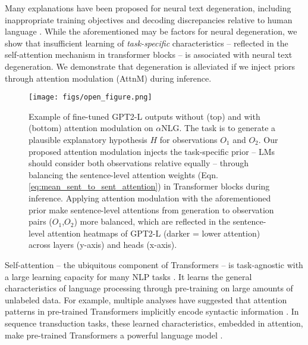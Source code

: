 \documentclass[11pt,a4paper]{article}
\newcommand{\alg}{attention modulation}
\begin{document}
Many explanations have been proposed for neural text degeneration, including inappropriate training objectives \citep{welleck2020neural} and decoding discrepancies relative to human language \cite{holtzman-etal-2018-learning, holtzman2020curious}.  While the aforementioned may be factors for neural degeneration, we show that insufficient learning of \textit{task-specific} characteristics -- reflected in the self-attention mechanism in transformer blocks -- is associated with neural text degeneration. We demonstrate that degeneration is alleviated if we inject priors through \alg{} (AttnM) %
during inference.
\begin{figure}[t]
    \centering
    \texttt{[image: figs/open\_figure.png]}

    \caption{Example of fine-tuned GPT2-L outputs without (top) and with (bottom)  \alg{} on $\alpha$NLG. The task is to generate a plausible explanatory hypothesis $H$ for observations $O_1$ and $O_2$.  Our proposed \alg{} injects the task-specific prior -- LMs should consider both observations relative equally --  through balancing the sentence-level attention weights (Eqn. \ref{eq:mean_sent_to_sent_attention}) in Transformer blocks during inference. Applying \alg{} with the aforementioned prior make sentence-level attentions from generation to observation pairs ($O_1$,$O_2$) more balanced\protect\footnotemark, which are reflected in the sentence-level attention heatmaps of GPT2-L (darker = lower attention) across layers (y-axis) and heads (x-axis). %
    }
\end{figure}


Self-attention -- the  ubiquitous component of Transformers -- is task-agnostic with a large learning capacity for many NLP tasks \citep{Vaswani2017AttentionIA,devlin-etal-2019-bert,Brown2020LanguageMA}. It learns the general characteristics of language processing through pre-training on large amounts of unlabeled data. For example, multiple analyses have suggested that attention patterns in pre-trained Transformers implicitly encode syntactic information \citep{raganato-tiedemann-2018-analysis,NEURIPS2019_2c601ad9, vig-belinkov-2019-analyzing}. %
In sequence transduction tasks, these learned characteristics, embedded in attention,  make pre-trained Transformers a powerful language model \citep{radford2019language}.  
\end{document}
